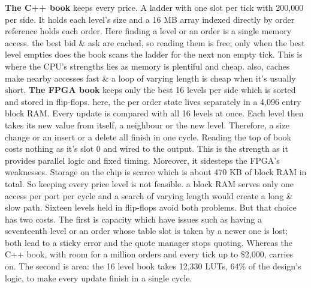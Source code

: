 \documentclass[11pt]{article}
\begin{document}
\textbf{The C++ book} keeps every price. A ladder with one slot per tick with 200,000 per side. It holds each level's size and a 16 MB array indexed directly by order reference holds each order. Here finding a level or an order is a single memory access. the best bid \& ask are cached, so reading them is free; only when the best level empties does the book scans the ladder for the next non empty tick. This is where the CPU's strengths lies as memory is plentiful and cheap. also, caches make nearby accesses fast \& a loop of varying length is cheap when it's usually short. \textbf{The FPGA book} keeps only the best 16 levels per side which is sorted and stored in flip-flops. here, the per order state lives separately in a 4,096 entry block RAM. Every update is compared with all 16 levels at once. Each level then takes its new value from itself, a neighbour or the new level. Therefore, a size change or an insert or a delete all finish in one cycle. Reading the top of book costs nothing as it's slot 0 and wired to the output. This is the strength as it provides parallel logic and fixed timing. Moreover, it sidesteps the FPGA's weaknesses. Storage on the chip is scarce which is about 470 KB of block RAM in total. So keeping every price level is not feasible. a block RAM serves only one access per port per cycle and a search of varying length would create a long \& slow path. Sixteen levels held in flip-flops avoid both problems. But that choice has two costs. The first is capacity which have issues such as having a seventeenth level or an order whose table slot is taken by a newer one is lost; both lead to a sticky error and the quote manager stops quoting. Whereas the C++ book, with room for a million orders and every tick up to \$2,000, carries on. The second is area: the 16 level book takes 12,330 LUTs, 64\% of the design's logic, to make every update finish in a single cycle.
\end{document}
